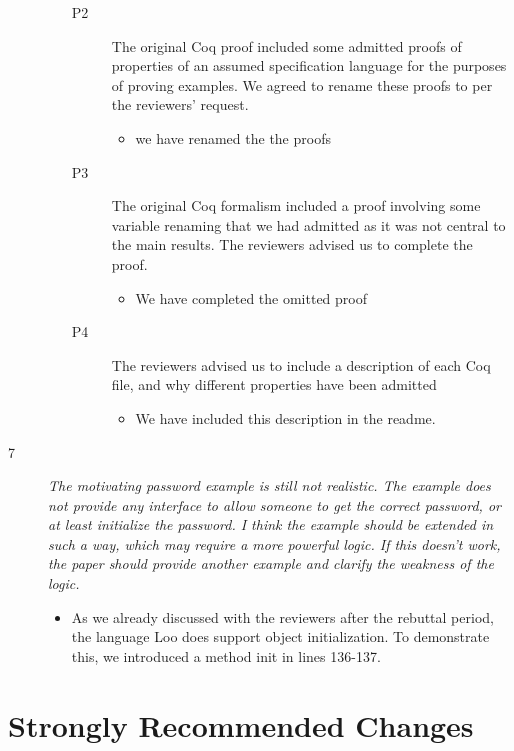 \documentclass[11pt]{amsart}
\begin{document}
\begin{description}
\begin{itemize}
\begin{description}
\item[P2]  The original Coq proof included some admitted 
proofs of properties of an assumed specification language for
the purposes of proving examples. We agreed to rename these 
proofs to  per the reviewers' request.
\begin{itemize}
\item we have renamed the the proofs
\end{itemize}

\item[P3] The original Coq formalism included a 
proof involving some variable renaming that we 
had admitted as it was not central to the main results.
The reviewers advised us to complete the proof.
\begin{itemize}
\item We have completed the omitted proof
\end{itemize}

\item[P4] The reviewers advised us to include a description of
each Coq file, and why different properties have been admitted
\begin{itemize}
\item We have included this description in the readme.

\end{itemize}
\end{description}
 
 \end{itemize}
 
 \item[7]
 \emph{
 The motivating password example is still not realistic. The example does not provide any interface to allow someone to get the correct password, or at least initialize the password. I think the example should be extended in such a way, which may require a more powerful logic. If this doesn't work, the paper should provide another example and clarify the weakness of the logic.
 }
 \begin{itemize}
 \item
 As we already discussed with the reviewers after the rebuttal period, the language Loo does support object initialization. To demonstrate this, we introduced a method init in lines 136-137.
 \end{itemize}
 
 \end{description}
 
 \section{Strongly Recommended Changes}
\end{document}
